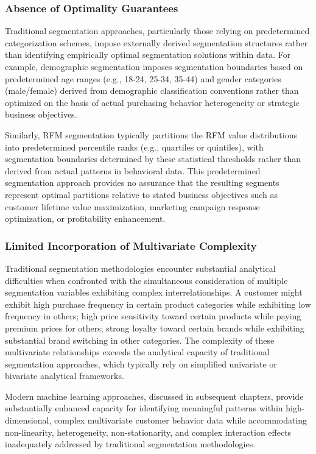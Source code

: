 \documentclass[12pt,a4paper,oneside]{report}
\begin{document}
\subsubsection{Absence of Optimality Guarantees}

Traditional segmentation approaches, particularly those relying on predetermined categorization schemes, impose externally derived segmentation structures rather than identifying empirically optimal segmentation solutions within data. For example, demographic segmentation imposes segmentation boundaries based on predetermined age ranges (e.g., 18-24, 25-34, 35-44) and gender categories (male/female) derived from demographic classification conventions rather than optimized on the basis of actual purchasing behavior heterogeneity or strategic business objectives.

Similarly, RFM segmentation typically partitions the RFM value distributions into predetermined percentile ranks (e.g., quartiles or quintiles), with segmentation boundaries determined by these statistical thresholds rather than derived from actual patterns in behavioral data. This predetermined segmentation approach provides no assurance that the resulting segments represent optimal partitions relative to stated business objectives such as customer lifetime value maximization, marketing campaign response optimization, or profitability enhancement.

\subsubsection{Limited Incorporation of Multivariate Complexity}

Traditional segmentation methodologies encounter substantial analytical difficulties when confronted with the simultaneous consideration of multiple segmentation variables exhibiting complex interrelationships. A customer might exhibit high purchase frequency in certain product categories while exhibiting low frequency in others; high price sensitivity toward certain products while paying premium prices for others; strong loyalty toward certain brands while exhibiting substantial brand switching in other categories. The complexity of these multivariate relationships exceeds the analytical capacity of traditional segmentation approaches, which typically rely on simplified univariate or bivariate analytical frameworks.

Modern machine learning approaches, discussed in subsequent chapters, provide substantially enhanced capacity for identifying meaningful patterns within high-dimensional, complex multivariate customer behavior data while accommodating non-linearity, heterogeneity, non-stationarity, and complex interaction effects inadequately addressed by traditional segmentation methodologies.
\end{document}
